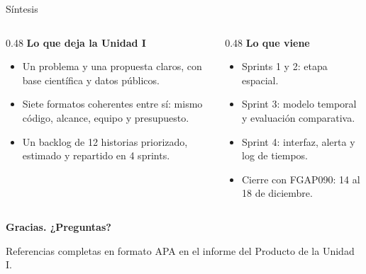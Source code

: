 \documentclass[aspectratio=169,11pt]{beamer}
\newcommand{\fuente}[1]{\par\vfill{\color{gris}\scriptsize #1}}
\begin{document}
\begin{frame}{Síntesis}
\begin{columns}[T]
\begin{column}{0.48\textwidth}
\textbf{\color{hecho}Lo que deja la Unidad I}
\begin{itemize}\setlength{\itemsep}{5pt}\small
  \item Un problema y una propuesta claros, con base científica y datos públicos.
  \item Siete formatos coherentes entre sí: mismo código, alcance, equipo y presupuesto.
  \item Un backlog de 12 historias priorizado, estimado y repartido en 4 sprints.
\end{itemize}
\end{column}
\begin{column}{0.48\textwidth}
\textbf{\color{pendiente}Lo que viene}
\begin{itemize}\setlength{\itemsep}{5pt}\small
  \item Sprints 1 y 2: etapa espacial.
  \item Sprint 3: modelo temporal y evaluación comparativa.
  \item Sprint 4: interfaz, alerta y log de tiempos.
  \item Cierre con FGAP090: 14 al 18 de diciembre.
\end{itemize}
\end{column}
\end{columns}
\vfill
\begin{center}\large\bfseries Gracias. ¿Preguntas?\end{center}
\fuente{Referencias completas en formato APA en el informe del Producto de la Unidad I.}
\end{frame}
\end{document}
